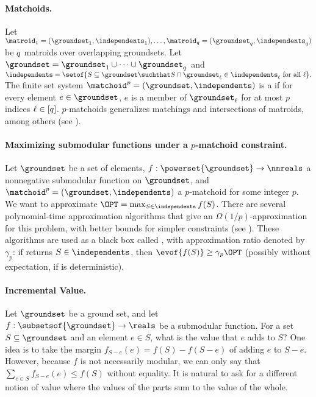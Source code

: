 \documentclass[oneside,letterpaper]{scrartcl} \usepackage{macros}
\newcommand{\mindex}{\ell}
\begin{document}
\paragraph{Matchoids.}
Let $\matroid_1 = (\groundset_1,\independents_1),\dots,\matroid_\nmat
= (\groundset_\nmat, \independents_\nmat)$ be $q$ matroids over
overlapping groundsets. Let $\groundset = \groundset_1 \cup \cdots
\cup \groundset_\nmat$ and
\begin{math}
  \independents = \setof{S \subseteq \groundset \suchthat S \cap
    \groundset_{\mindex} \in \independents_{\mindex} \text{ for all
    }\ell}.
\end{math}
The finite set system $\defpmatchoid$ is a  if
for every element $e \in \groundset$, $e$ is a member of
$\groundset_{\mindex}$ for at most $p$ indices $\mindex \in [\nmat]$.
$p$-matchoids generalizes matchings and intersections of matroids,
among others (see ).




\paragraph{Maximizing submodular functions under a $p$-matchoid
  constraint.}


Let $\groundset$ be a set of elements, $f: \powerset{\groundset} \to
\nnreals$ a nonnegative submodular function on $\groundset$, and
$\defpmatchoid$ a $p$-matchoid for some integer $p$. We want to approximate $\OPT = \max_{S \in \independents} f(S)$.
There are several polynomial-time approximation algorithms that give
an $\Omega(1/p)$-approximation for this problem, with better bounds
for simpler constraints (see ).
These algorithms are used as a black box called ,
with approximation ratio denoted by $\gamma_p$: if 
returns $S \in \independents$, then $\evof{f(S)} \geq \gamma_p \OPT$
(possibly without expectation, if  is deterministic).





\paragraph{Incremental Value.}

\newcommand{\incvalue}{\nu}
\newcommand{\incrementalvalueof}[3]{\incvalue\parof{#1,#2,#3}}
\newcommand{\incvalueof}{\incrementalvalueof}


Let $\groundset$ be a ground set, and let $f: \subsetsof{\groundset}
\to \reals$ be a submodular function. For a set $S \subseteq
\groundset$ and an element $e \in S$, what is the value that $e$ adds
to $S$? One idea is to take the margin $f_{S - e}(e) = f(S) - f(S -
e)$ of adding $e$ to $S - e$. However, because $f$ is not necessarily
modular, we can only say that $\sum_{e \in S} f_{S - e}(e) \leq f(S)$
without equality. It is natural to ask for a different notion of value
where the values of the parts sum to the value of the whole.
\end{document}
